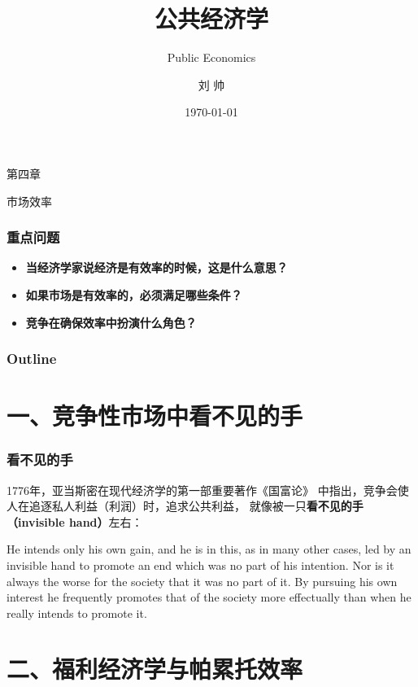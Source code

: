 \documentclass[aspectratio=169, 12pt]{beamer}
\title{公共经济学}
\subtitle{Public Economics}
\author[LIU ShHUAI]{刘 {  } 帅}
\institute{山西师范大学 {  } 经济与管理学院}
\date{\today}
\begin{document}
\maketitle

\begin{frame}[standout]
    第四章\par
    \addtolength{\parskip}{.4em}
    市场效率
\end{frame}

\begin{frame}[plain]
    \frametitle{重点问题}
    \begin{itemize}
        \item \textbf{当经济学家说经济是有效率的时候，这是什么意思？}
        \item \textbf{如果市场是有效率的，必须满足哪些条件？}
        \item \textbf{竞争在确保效率中扮演什么角色？}
    \end{itemize}
\end{frame}

\begin{frame}[plain]
    \frametitle{Outline}
    \tableofcontents[hideallsubsections]
\end{frame}

\section{一、竞争性市场中看不见的手}

\begin{frame}[plain]
    \frametitle{看不见的手}
    1776年，亚当斯密在现代经济学的第一部重要著作《国富论》
    中指出，竞争会使人在追逐私人利益（利润）时，追求公共利益，
    就像被一只\textbf{看不见的手（invisible hand）}左右：
    \par
    He intends only his own gain, and he is in this, as in many other cases, led by an invisible hand to promote an end which was no part of his intention. Nor is it always the worse for the society that it was no part of it. By pursuing his own interest he frequently promotes that of the society more effectually than when he really intends to promote it.
\end{frame}

\section{二、福利经济学与帕累托效率}
\end{document}

